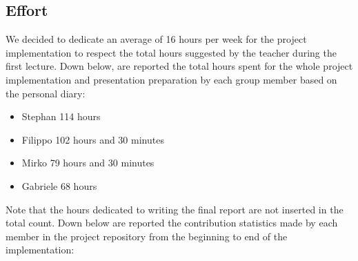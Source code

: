 \subsection{Effort}
We decided to dedicate an average of 16 hours per week for the project implementation to respect the total hours suggested by the teacher during the first lecture.\newline
Down below, are reported the total hours spent for the whole project implementation and presentation preparation by each group member based on the personal diary:
\begin{itemize}
  \item Stephan 114 hours
  \item Filippo 102 hours and 30 minutes
  \item Mirko 79 hours and 30 minutes
  \item Gabriele 68 hours
\end{itemize}
Note that the hours dedicated to writing the final report are not inserted in the total count.\newline
Down below are reported the contribution statistics made by each member in the project repository from the beginning to end of the implementation:
